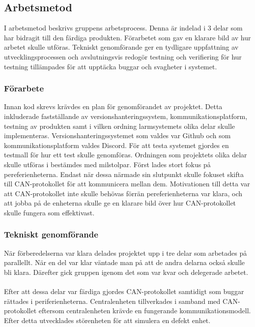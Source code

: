 \documentclass{article}
\begin{document}
\subsection{Arbetsmetod}
I arbetsmetod beskrivs gruppens arbetsprocess. Denna är indelad i 3 delar som har bidragit till den färdiga produkten. Förarbetet som gav en klarare bild av hur arbetet skulle utföras. Tekniskt genomförande ger en tydligare uppfattning av utvecklingsprocessen och avslutningsvis redogör testning och verifiering för hur testning tillämpades för att upptäcka buggar och svagheter i systemet.

\subsubsection{Förarbete}
Innan kod skrevs krävdes en plan för genomförandet av projektet.
Detta inkluderade fastställande av versionshanteringssystem, kommunikationsplatform, testning av produkten samt i vilken ordning larmsystemets olika delar skulle implementeras.
Versionshanteringssystemet som valdes var Github och som kommunikationsplatform valdes Discord.
För att testa systemet gjordes en testmall för hur ett test skulle genomföras. 
Ordningen som projektets olika delar skulle utföras i bestämdes med milstolpar. Först lades stort fokus på pereferienheterna. 
Endast när dessa närmade sin slutpunkt skulle fokuset skifta till CAN-protokollet för att kommunicera mellan dem. 
Motivationen till detta var att CAN-protokollet inte skulle behövas förrän pereferienheterna var klara, och att jobba på de enheterna skulle ge en klarare bild över hur CAN-protokollet skulle fungera som effektivast.

\subsubsection{Tekniskt genomförande}
När förberedelserna var klara delades projektet upp i tre delar som arbetades på parallellt. När en del var klar väntade man på att de andra delarna också skulle bli klara. 
Därefter gick gruppen igenom det som var kvar och delegerade arbetet.
\\
\\
Efter att dessa delar var färdiga gjordes CAN-protokollet samtidigt som buggar rättades i periferienheterna. Centralenheten tillverkades i samband med CAN-protokollet eftersom centralenheten krävde en fungerande kommunikationsmodell. Efter detta utvecklades störenheten för att simulera en defekt enhet.
\end{document}
